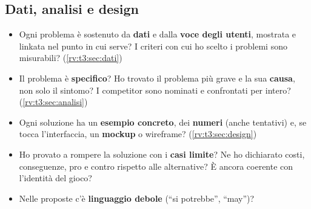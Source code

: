 \subsection{Dati, analisi e design}
\begin{itemize}
  \item Ogni problema è sostenuto da \textbf{dati} e dalla \textbf{voce
        degli utenti}, mostrata e linkata nel punto in cui serve? I criteri
        con cui ho scelto i problemi sono misurabili?
        (\ref{rv:t3:sec:dati})
  \item Il problema è \textbf{specifico}? Ho trovato il problema più grave
        e la sua \textbf{causa}, non solo il sintomo? I competitor sono
        nominati e confrontati per intero? (\ref{rv:t3:sec:analisi})
  \item Ogni soluzione ha un \textbf{esempio concreto}, dei \textbf{numeri}
        (anche tentativi) e, se tocca l'interfaccia, un \textbf{mockup} o
        wireframe? (\ref{rv:t3:sec:design})
  \item Ho provato a rompere la soluzione con i \textbf{casi limite}? Ne ho
        dichiarato costi, conseguenze, pro e contro rispetto alle
        alternative? È ancora coerente con l'identità del gioco?
  \item Nelle proposte c'è \textbf{linguaggio debole} (``si potrebbe'',
        ``may'')?
\end{itemize}

